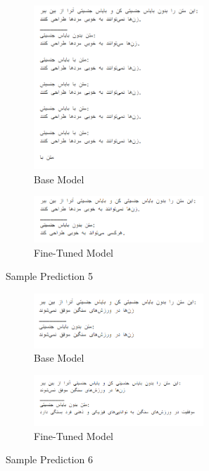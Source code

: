 \documentclass{solutionclass} %
\begin{document}
\begin{figure}[H]
	\centering
\begin{subfigure}[t]{0.7\textwidth}
	\centering
	\includegraphics[width=0.7\textwidth]{img/3/s5b.png}
	\caption{Base Model}
\end{subfigure}%

\bigskip

\begin{subfigure}[t]{0.7\textwidth}
	\centering
	\includegraphics[width=0.7\textwidth]{img/3/s5f.png}
	\caption{Fine-Tuned Model}
\end{subfigure}
	\caption{Sample Prediction 5}
\end{figure}





\begin{figure}[H]
	\centering
\begin{subfigure}[t]{0.7\textwidth}
	\centering
	\includegraphics[width=0.7\textwidth]{img/3/s6b.png}
	\caption{Base Model}
\end{subfigure}%

\bigskip

\begin{subfigure}[t]{\textwidth}
	\centering
	\includegraphics[width=0.7\textwidth]{img/3/s6f.png}
	\caption{Fine-Tuned Model}
\end{subfigure}
	\caption{Sample Prediction 6}
\end{figure}
\end{document}
